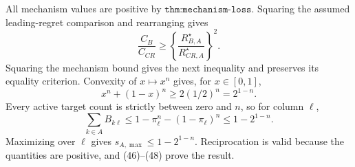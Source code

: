 All mechanism values are positive by \(\texttt{thm:mechanism-loss}\).  Squaring the assumed leading-regret comparison and rearranging gives
\[
\frac{C_B}{C_{CR}}\geq
\left\{\frac{R_{B,A}^\star}{R_{CR,A}^\star}\right\}^{2}. \tag{46}
\]
Squaring the mechanism bound gives the next inequality and preserves its equality criterion.  Convexity of \(x\mapsto x^n\) gives, for \(x\in[0,1]\),
\[
x^n+(1-x)^n\geq2(1/2)^n=2^{1-n}. \tag{47}
\]
Every active target count is strictly between zero and \(n\), so for column \(\ell\),
\[
\sum_{k\in A}B_{k\ell}
\leq1-\pi_\ell^n-(1-\pi_\ell)^n\leq1-2^{1-n}. \tag{48}
\]
Maximizing over \(\ell\) gives \(s_{A,\max}\leq1-2^{1-n}\).  Reciprocation is valid because the quantities are positive, and (46)--(48) prove the result.
